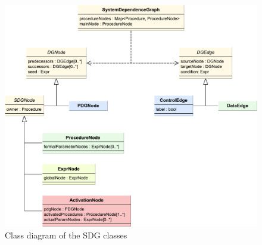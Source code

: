 \begin{figure}[hpb]
  \centering
    \includegraphics[width=\textwidth]{bilder/sdg-class}
  \caption{Class diagram of the SDG classes}
  \label{fig:sdg-class}
\end{figure}
